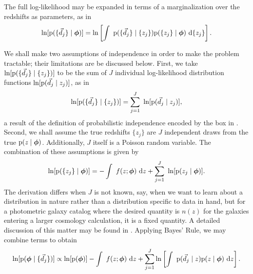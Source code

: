 The full log-likelihood may be expanded in terms of a marginalization over the redshifts as parameters, as in 
\begin{equation}
\eqlabel{eqn:marginalize}
\ln[\pr{\{\data_{j}\} \gvn \ndphi}] = \ln\left[\integral{\pr{\{\data_{j}\} \gvn \{z_{j}\}} \pr{\{z_{j}\} \gvn \ndphi}}{\{z_{j}\}}\right].
\end{equation}

We shall make two assumptions of independence in order to make the problem tractable; their limitations are be discussed below.  
First, we take $\ln[\mathrm{p}(\{\vec{d}_{j}\} \mid \{z_{j}\})]$ to be the sum of $J$ individual log-likelihood distribution functions $\ln[\mathrm{p}(\vec{d}_{j} \mid z_{j})]$, as in 
\begin{equation}
\eqlabel{eqn:indiedat}
\ln[\pr{\{\data_{j}\} \gvn \{z_{j}\}}] = \sum_{j=1}^{J}\ \ln[\pr{\data_{j} \gvn z_{j}}],
\end{equation}
a result of the definition of probabilistic independence encoded by the box in .
Second, we shall assume the true redshifts $\{z_{j}\}$ are $J$ independent draws from the true $\mathrm{p}(z \mid {\ensuremath{\boldsymbol{\phi}}})$.  
Additionally, $J$ itself is a Poisson random variable.  
The combination of these assumptions is given by 
\begin{equation}
\eqlabel{eqn:indie}
\ln[\pr{\{z_{j}\} \gvn \ndphi}] = -\integral{f(z; \ndphi)}{z} + \sum_{j=1}^{J}\ \ln[\pr{z_{j} \gvn \ndphi}].
\end{equation}
The derivation differs when $J$ is not known, say, when we want to learn about a distribution in nature rather than a distribution specific to data in hand, but for a photometric galaxy catalog where the desired quantity is $n(z)$ for the galaxies entering a larger cosmology calculation, it is a fixed quantity.
A detailed discussion of this matter may be found in \citet{Foreman-Mackey2014}.  
Applying Bayes' Rule, we may combine terms to obtain 
\begin{equation}
\eqlabel{eqn:posterior}
\ln[\pr{\ndphi \gvn \{\data_{j}\}}] \propto \ln[\pr{\ndphi}] - \integral{f(z; \ndphi)}{z} + \sum_{j=1}^{J}\ln\left[\integral{\pr{\data_{j} \gvn z} \pr{z \gvn \ndphi}}{z}\right].
\end{equation}

